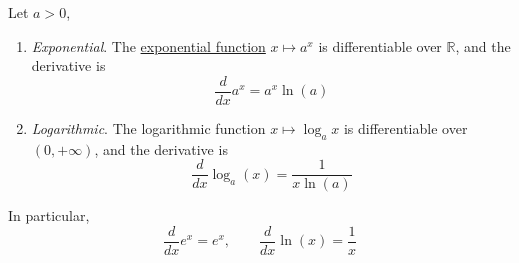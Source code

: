   \begin{theorem}
    \label{thm:differentiation-of-exponential-and-logarithmic}
    Let $a > 0$, 
    \begin{enumerate}
      \item \textit{Exponential}. The \hyperref[def:exponential-function]{exponential function} $x \mapsto a^x$ is differentiable over $\mathbb{R}$, and the derivative is 
        \begin{equation}
          \frac{d}{dx} a^x = a^x \ln(a)
        \end{equation}

      \item \textit{Logarithmic}. The logarithmic function $x \mapsto \log_a x$ is differentiable over $(0, +\infty)$, and the derivative is 
        \begin{equation}
          \frac{d}{dx} \log_a (x) = \frac{1}{x \ln(a)} 
        \end{equation}
    \end{enumerate}
    In particular, 
    \begin{equation}
      \frac{d}{dx} e^x = e^x, \qquad \frac{d}{dx} \ln (x) = \frac{1}{x}
    \end{equation}
  \end{theorem}
